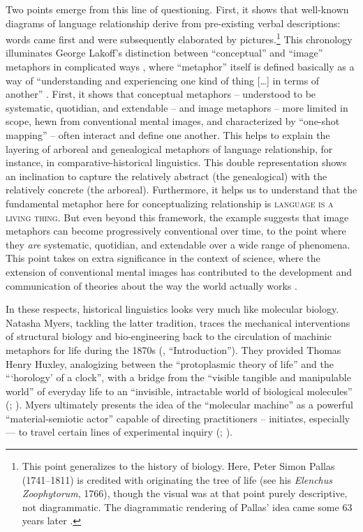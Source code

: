 \documentclass[output=paper]{langscibook}
\begin{document}
Two points emerge from this line of questioning. First, it shows that well-known diagrams of language relationship derive from pre-existing verbal descriptions: words came first and were subsequently elaborated by pictures.\footnote{This point generalizes to the history of biology. Here, Peter Simon Pallas (1741--1811) is credited with originating the tree of life (see his \emph{Elenchus Zoophytorum}, 1766), though the visual was at that point purely descriptive, not diagrammatic. The diagrammatic rendering of Pallas' idea came some 63 years later \citep{Eichwald1829}.} This chronology illuminates George Lakoff's distinction between ``conceptual'' and ``image'' metaphors in complicated ways \citep{Lakoff1987}, where ``metaphor'' itself is defined basically as a way of ``understanding and experiencing one kind of thing […] in terms of another'' \citep[455]{LakoffJohnson1980}. First, it shows that conceptual metaphors -- understood to be systematic, quotidian, and extendable -- and image metaphors -- more limited in scope, hewn from conventional mental images, and characterized by ``one-shot mapping'' -- often interact and define one another. This helps to explain the layering of arboreal and genealogical metaphors of language relationship, for instance, in comparative-historical linguistics. This double representation shows an inclination to capture the relatively abstract (the genealogical) with the relatively concrete (the arboreal). Furthermore, it helps us to understand that the fundamental metaphor here for conceptualizing relationship is \textsc{language is a living thing}. But even beyond this framework, the example suggests that image metaphors can become progressively conventional over time, to the point where they \emph{are} systematic, quotidian, and extendable over a wide range of phenomena. This point takes on extra significance in the context of science, where the extension of conventional mental images has contributed to the development and communication of theories about the way the world actually works \citep[see][357]{Boyd1979}.

In these respects, historical linguistics looks very much like molecular biology. Natasha Myers, tackling the latter tradition, traces the mechanical interventions of structural biology and bio-engineering back to the circulation of machinic metaphors for life during the 1870s (\citealt{Myers2015}, ``Introduction''). They provided Thomas Henry Huxley, analogizing between the ``protoplasmic theory of life'' and the ```horology' of a clock'', with a bridge from the ``visible tangible and manipulable world'' of everyday life to an ``invisible, intractable world of biological molecules'' (\citealt{Huxley1880}; \citealt[157]{Myers2014}). Myers ultimately presents the idea of the ``molecular machine'' as a powerful ``material-semiotic actor'' capable of directing practitioners -- initiates, especially — to travel certain lines of experimental inquiry (\citealt{Haraway1991}; \citealt[165--168]{Myers2014}).
\end{document}
